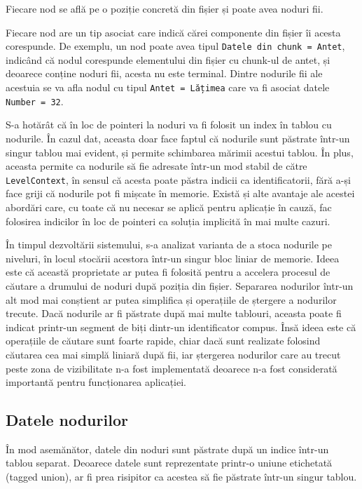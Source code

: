 \documentclass[a4paper,12pt]{report}
\begin{document}
Fiecare nod se află pe o poziție concretă din fișier și poate avea noduri fii.

Fiecare nod are un tip asociat care indică cărei componente din fișier îi acesta corespunde.
De exemplu, un nod poate avea tipul \texttt{Datele din chunk = Antet},
indicând că nodul corespunde elementului din fișier cu chunk-ul de antet,
și deoarece conține noduri fii, acesta nu este terminal.
Dintre nodurile fii ale acestuia se va afla nodul cu tipul \texttt{Antet = Lățimea}
care va fi asociat datele \texttt{Number = 32}.

S-a hotărât că în loc de pointeri la noduri va fi folosit un index în tablou cu nodurile.
În cazul dat, aceasta doar face faptul că nodurile sunt păstrate într-un singur tablou mai evident,
și permite schimbarea mărimii acestui tablou.
În plus, aceasta permite ca nodurile să fie adresate într-un mod stabil de către \texttt{LevelContext},
în sensul că acesta poate păstra indicii ca identificatorii, fără a-și face griji că nodurile pot fi mișcate în memorie.
Există și alte avantaje ale acestei abordări care, cu toate că nu necesar se aplică pentru aplicație în cauză,
fac folosirea indicilor în loc de pointeri ca soluția implicită în mai multe cazuri.

În timpul dezvoltării sistemului, s-a analizat varianta de a stoca nodurile pe niveluri,
în locul stocării acestora într-un singur bloc liniar de memorie.
Ideea este că această proprietate ar putea fi folosită pentru a accelera procesul de căutare
a drumului de noduri după poziția din fișier.
Separarea nodurilor într-un alt mod mai conștient ar putea simplifica
și operațiile de ștergere a nodurilor trecute.
Dacă nodurile ar fi păstrate după mai multe tablouri,
aceasta poate fi indicat printr-un segment de biți dintr-un identificator compus.
Însă ideea este că operațiile de căutare sunt foarte rapide,
chiar dacă sunt realizate folosind căutarea cea mai simplă liniară după fii,
iar ștergerea nodurilor care au trecut peste zona de vizibilitate
n-a fost implementată deoarece n-a fost considerată importantă pentru funcționarea aplicației.

\subsection{Datele nodurilor}

În mod asemănător, datele din noduri sunt păstrate după un indice într-un tablou separat.
Deoarece datele sunt reprezentate printr-o uniune etichetată (tagged union),
ar fi prea risipitor ca acestea să fie păstrate într-un singur tablou.
\end{document}
